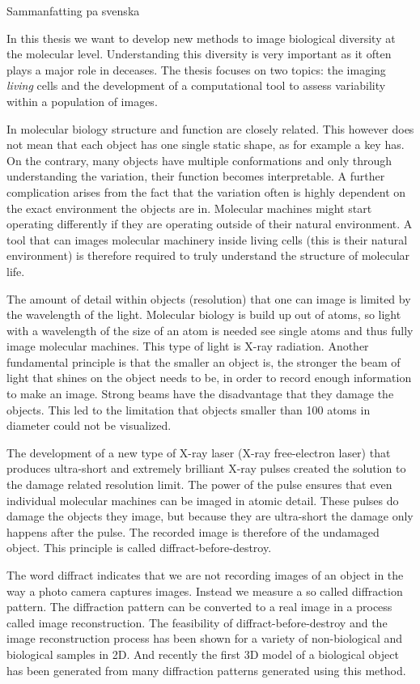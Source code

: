 Sammanfatting pa svenska

In this thesis we want to develop new methods to image biological diversity at the molecular level. Understanding this diversity is very important as it often plays a major role in deceases. The thesis focuses on two topics: the imaging \textit{living} cells and the development of a computational tool to assess variability within a population of images.


In molecular biology structure and function are closely related. This however does not mean that each object has one single static shape, as for example a key has. On the contrary, many objects have multiple conformations and only through understanding the variation, their function becomes interpretable. A further complication arises from the fact that the variation often is highly dependent on the exact environment the objects are in. Molecular machines might start operating differently if they are operating outside of their natural environment. A tool that can images molecular machinery inside living cells (this is their natural environment) is therefore required to truly understand the structure of molecular life.


The amount of detail within objects (resolution) that one can image is limited by the wavelength of the light. Molecular biology is build up out of atoms, so light with a wavelength of the size of an atom is needed see single atoms and thus fully image molecular machines. This type of light is X-ray radiation. Another fundamental principle is that the smaller an object is, the stronger the beam of light that shines on the object needs to be, in order to record enough information to make an image. Strong beams have the disadvantage that they damage the objects. This led to the limitation that objects smaller than 100 atoms in diameter could not be visualized.


The development of a new type of X-ray laser (X-ray free-electron laser) that produces ultra-short and extremely brilliant X-ray pulses created the solution to the damage related resolution limit. The power of the pulse ensures that even individual molecular machines can be imaged in atomic detail. These pulses do damage the objects they image, but because they are ultra-short the damage only happens after the pulse. The recorded image is therefore of the undamaged object. This principle is called diffract-before-destroy. 

The word diffract indicates that we are not recording images of an object in the way a photo camera captures images. Instead we measure a so called diffraction pattern. The diffraction pattern can be converted to a real image in a process called image reconstruction. The feasibility of diffract-before-destroy and the image reconstruction process has been shown for a variety of non-biological and biological samples in 2D.  And recently the first 3D model of a biological object has been generated from many diffraction patterns generated using this method.

